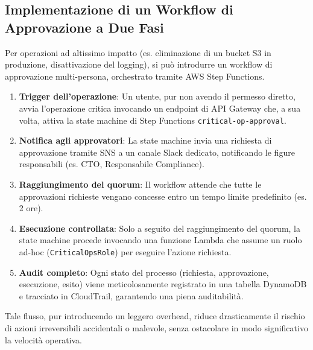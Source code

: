 \subsection{Implementazione di un Workflow di Approvazione a Due Fasi}
\label{subsubsec:approvazione_due_fasi}
Per operazioni ad altissimo impatto (es. eliminazione di un bucket S3 in produzione, disattivazione del logging), si può introdurre un workflow di approvazione multi-persona, orchestrato tramite AWS Step Functions.

\begin{enumerate}
\item \textbf{Trigger dell'operazione}: Un utente, pur non avendo il permesso diretto, avvia l'operazione critica invocando un endpoint di API Gateway che, a sua volta, attiva la state machine di Step Functions \texttt{critical-op-approval}.
\item \textbf{Notifica agli approvatori}: La state machine invia una richiesta di approvazione tramite SNS a un canale Slack dedicato, notificando le figure responsabili (es. CTO, Responsabile Compliance).
\item \textbf{Raggiungimento del quorum}: Il workflow attende che tutte le approvazioni richieste vengano concesse entro un tempo limite predefinito (es. 2 ore).
\item \textbf{Esecuzione controllata}: Solo a seguito del raggiungimento del quorum, la state machine procede invocando una funzione Lambda che assume un ruolo ad-hoc (\texttt{CriticalOpsRole}) per eseguire l'azione richiesta.
\item \textbf{Audit completo}: Ogni stato del processo (richiesta, approvazione, esecuzione, esito) viene meticolosamente registrato in una tabella DynamoDB e tracciato in CloudTrail, garantendo una piena auditabilità.
\end{enumerate}

Tale flusso, pur introducendo un leggero overhead, riduce drasticamente il rischio di azioni irreversibili accidentali o malevole, senza ostacolare in modo significativo la velocità operativa.

